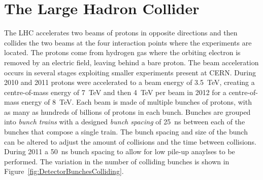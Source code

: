 \section{The Large Hadron Collider} \label{sec:the_large_hadron_collider}

The LHC accelerates two beams of protons in opposite directions and then collides the two beams at the four interaction points where the experiments are located. The protons come from hydrogen gas where the orbiting electron is removed by an electric field, leaving behind a bare proton. The beam acceleration occurs in several stages exploiting smaller experiments present at CERN. During 2010 and 2011 protons were accelerated to a beam energy of \SI{3.5}{\TeV}, creating a centre-of-mass energy of \SI{7}{\TeV} and then \SI{4}{\TeV} per beam in 2012 for a centre-of-mass energy of \SI{8}{\TeV}. Each beam is made of multiple bunches of protons, with as many as hundreds of billions of protons in each bunch. Bunches are grouped into \textit{bunch trains} with a designed \textit{bunch spacing} of \SI{25}{\ns} between each of the bunches that compose a single train. The bunch spacing and size of the bunch can be altered to adjust the amount of collisions and the time between collisions. During 2011 a \SI{50}{\ns} bunch spacing to allow for low pile-up anaylses to be performed. The variation in the number of colliding bunches is shown in Figure~\ref{fig:DetectorBunchesColliding}.

